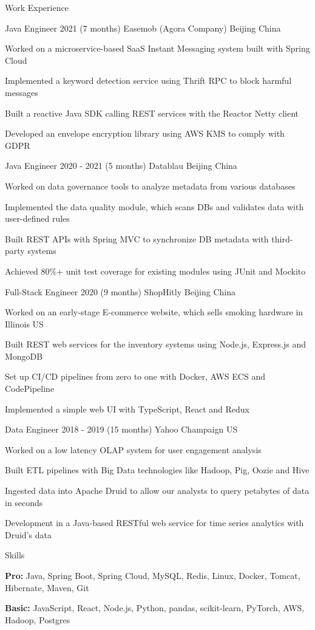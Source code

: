\documentclass{resume} %
\begin{document}
\begin{rSection}{Work Experience}

\begin{rSubsection}
{Java Engineer} {2021 (7 months)} {Easemob (Agora Company)} {Beijing China}
\item Worked on a microservice-based SaaS Instant Messaging system built with Spring Cloud
\item Implemented a keyword detection service using Thrift RPC to block harmful messages
\item Built a reactive Java SDK calling REST services with the Reactor Netty client
\item Developed an envelope encryption library using AWS KMS to comply with GDPR
\end{rSubsection}

\begin{rSubsection}
{Java Engineer} {2020 - 2021 (5 months)} {Datablau} {Beijing China}
\item Worked on data governance tools to analyze metadata from various databases
\item Implemented the data quality module, which scans DBs and validates data with user-defined rules
\item Built REST APIs with Spring MVC to synchronize DB metadata with third-party systems
\item Achieved 80\%+ unit test coverage for existing modules using JUnit and Mockito
\end{rSubsection}

\begin{rSubsection}
{Full-Stack Engineer} {2020 (9 months)} {ShopHitly} {Beijing China}
\item Worked on an early-stage E-commerce website, which sells smoking hardware in Illinois US
\item Built REST web services for the inventory systems using Node.js, Express.js and MongoDB
\item Set up CI/CD pipelines from zero to one with Docker, AWS ECS and CodePipeline
\item Implemented a simple web UI with TypeScript, React and Redux
\end{rSubsection}

\begin{rSubsection}
{Data Engineer} {2018 - 2019 (15 months)} {Yahoo} {Champaign US}
\item Worked on a low latency OLAP system for user engagement analysis
\item Built ETL pipelines with Big Data technologies like Hadoop, Pig, Oozie and Hive
\item Ingested data into Apache Druid to allow our analysts to query petabytes of data in seconds
\item Development in a Java-based RESTful web service for time series analytics with Druid's data
\end{rSubsection}

\end{rSection}

\begin{skillSection}{Skills}
\item {\bf Pro:} Java, Spring Boot, Spring Cloud, MySQL, Redis, Linux, Docker, Tomcat, Hibernate, Maven, Git
\item {\bf Basic:} JavaScript, React, Node.js, Python, pandas, scikit-learn, PyTorch, AWS, Hadoop, Postgres
\end{skillSection}
\end{document}
